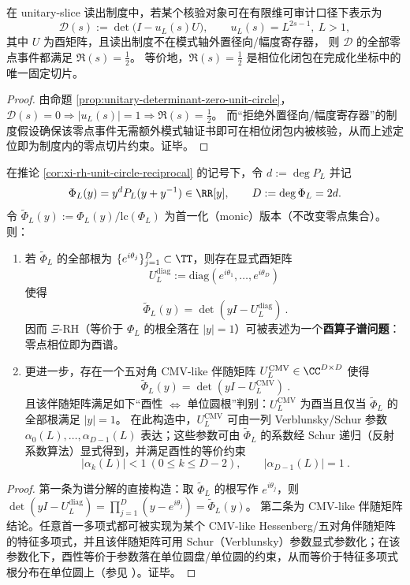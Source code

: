 \begin{theorem}\label{thm:phase-lift-fixed-slice}
在 unitary-slice 读出制度中，若某个核验对象可在有限维可审计口径下表示为
\[
\mathcal{D}(s):=\det\!\bigl(I-u_L(s)U\bigr),
\qquad
u_L(s)=L^{2s-1},\ L>1,
\]
其中 \(U\) 为酉矩阵，且读出制度不在模式轴外置径向/幅度寄存器，
则 \(\mathcal{D}\) 的全部零点事件都满足 \(\Re(s)=\tfrac12\)。
等价地，\(\Re(s)=\tfrac12\) 是相位化闭包在完成化坐标中的唯一固定切片。
\end{theorem}
\begin{proof}
由命题 \ref{prop:unitary-determinant-zero-unit-circle}，\(\mathcal{D}(s)=0\Rightarrow |u_L(s)|=1\Rightarrow \Re(s)=\tfrac12\)。
而“拒绝外置径向/幅度寄存器”的制度假设确保该零点事件无需额外模式轴证书即可在相位闭包内被核验，从而上述定位即为制度内的零点切片约束。证毕。
\end{proof}

\begin{proposition}\label{prop:xi-hilbert-polya-cmv}
在推论 \ref{cor:xi-rh-unit-circle-reciprocal} 的记号下，令 \(d:=\deg P_L\) 并记
\[
\Phi_L(y)=y^dP_L(y+y^{-1})\in\RR[y],
\qquad
D:=\deg \Phi_L=2d.
\]
令 \(\widetilde\Phi_L(y):=\Phi_L(y)/\mathrm{lc}(\Phi_L)\) 为首一化（monic）版本（不改变零点集合）。
则：
\begin{enumerate}
  \item 若 \(\widetilde\Phi_L\) 的全部根为 \(\{e^{i\theta_j}\}_{j=1}^{D}\subset\TT\)，则存在显式酉矩阵
  \[
  U_L^{\mathrm{diag}}:=\mathrm{diag}(e^{i\theta_1},\dots,e^{i\theta_D})
  \]
  使得
  \[
  \boxed{\ \widetilde\Phi_L(y)=\det(yI-U_L^{\mathrm{diag}})\ }.
  \]
  因而 \(\Xi\)-RH（等价于 \(\Phi_L\) 的根全落在 \(|y|=1\)）可被表述为一个\textbf{酉算子谱问题}：零点相位即为酉谱。
  \item 更进一步，存在一个五对角 CMV-like 伴随矩阵 \(U_L^{\mathrm{CMV}}\in\CC^{D\times D}\) 使得
  \[
  \boxed{\ \widetilde\Phi_L(y)=\det(yI-U_L^{\mathrm{CMV}})\ }.
  \]
  且该伴随矩阵满足如下“酉性 \(\Leftrightarrow\) 单位圆根”判别：\(U_L^{\mathrm{CMV}}\) 为酉当且仅当 \(\widetilde\Phi_L\) 的全部根满足 \(|y|=1\)。
  在此构造中，\(U_L^{\mathrm{CMV}}\) 可由一列 Verblunsky/Schur 参数 \(\alpha_0(L),\dots,\alpha_{D-1}(L)\) 表达；这些参数可由 \(\widetilde\Phi_L\) 的系数经 Schur 递归（反射系数算法）显式得到，并满足酉性的等价约束
  \[
  \boxed{\ |\alpha_k(L)|<1\ (0\le k\le D-2),\qquad |\alpha_{D-1}(L)|=1\ }.
  \]
\end{enumerate}
\end{proposition}
\begin{proof}
第一条为谱分解的直接构造：取 \(\widetilde\Phi_L\) 的根写作 \(e^{i\theta_j}\)，则 \(\det(yI-U_L^{\mathrm{diag}})=\prod_{j=1}^{D}(y-e^{i\theta_j})=\widetilde\Phi_L(y)\)。
第二条为 CMV-like 伴随矩阵结论。任意首一多项式都可被实现为某个 CMV-like Hessenberg/五对角伴随矩阵的特征多项式，并且该伴随矩阵可用 Schur（Verblunsky）参数显式参数化；在该参数化下，酉性等价于参数落在单位圆盘/单位圆的约束，从而等价于特征多项式根分布在单位圆上（参见 \cite{CanteroMoralVelazquez2003CMV,Simon2005OPUC1,BevilacquaDelCorsoGemignani2015CMVCompanion}）。证毕。
\end{proof}

